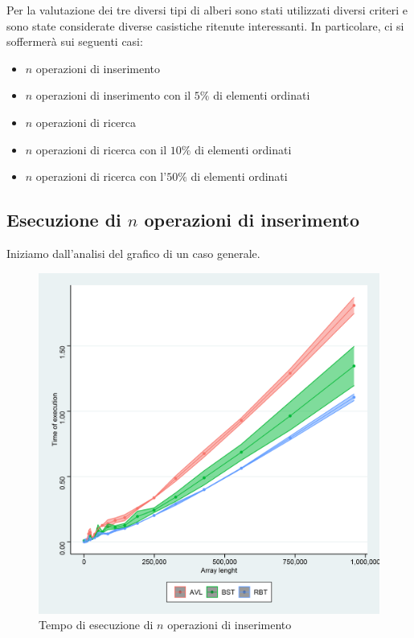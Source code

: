 \documentclass{article}
\begin{document}
	Per la valutazione dei tre diversi tipi di alberi sono stati utilizzati diversi criteri e sono state considerate diverse casistiche ritenute interessanti. In particolare, ci si soffermerà sui seguenti casi:
	
	\begin{itemize}
		\item $n$ operazioni di inserimento
		\item $n$ operazioni di inserimento con il $5\%$ di elementi ordinati
		\item $n$ operazioni di ricerca
		\item $n$ operazioni di ricerca con il $10\%$ di elementi ordinati 
		\item $n$ operazioni di ricerca con l'$50\%$ di elementi ordinati 
	\end{itemize}
	
	\newpage
	
	\subsection{Esecuzione di $n$ operazioni di inserimento}
	\label{subsection:n_op_ins}
	Iniziamo dall'analisi del grafico di un caso generale.
	
	\begin{figure}[h!]
		\centering
  		\includegraphics[width=1 \columnwidth]{Grafici/Grafico_All.png}
  		\caption{Tempo di esecuzione di $n$ operazioni di inserimento}
  		\label{fig:graph2}
	\end{figure}
	
\end{document}
